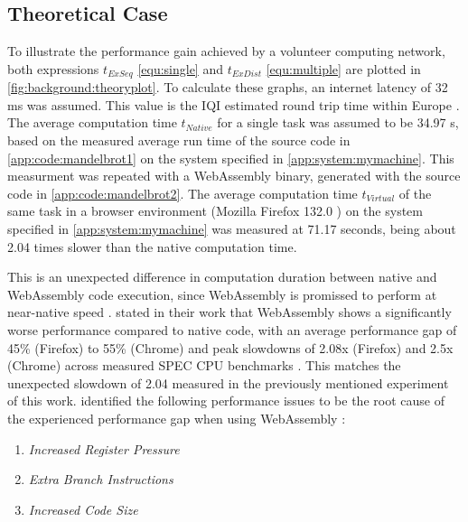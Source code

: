 \subsection{Theoretical Case}
\label{subsec:background:theroy_example}
To illustrate the performance gain achieved by a volunteer computing network, both expressions $t_{ExSeq}$ \eqref{equ:single} and $t_{ExDist}$ \eqref{equ:multiple} are plotted in \autoref{fig:background:theoryplot}. To calculate these graphs, an internet latency of 32 ms \cite{backend:latency} was assumed. This value is the \ac{IQI} estimated round trip time within Europe \cite{backend:latency}. The average computation time $t_{Native}$ for a single task was assumed to be 34.97 s, based on the measured average run time of the source code in \autoref{app:code:mandelbrot1} on the system specified in \autoref{app:system:mymachine}. This measurment was repeated with a WebAssembly binary, generated with the source code in \autoref{app:code:mandelbrot2}. The average computation time $t_{Virtual}$ of the same task in a browser environment (Mozilla Firefox 132.0 \cite{background:firefox}) on the system specified in \autoref{app:system:mymachine} was measured at 71.17 seconds, being about 2.04 times slower than the native computation time.
\newline
\begin{addmargin}[25pt]{25pt}
  This is an unexpected difference in computation duration between native and WebAssembly code execution, since WebAssembly is promissed to perform at near-native speed \cite{methodology:wasm, methodology:wasmW3C}. \citeauthor{background:not-so-fast} stated in their work that WebAssembly shows a significantly worse performance compared to native code, with an average performance gap of 45\% (Firefox) to 55\% (Chrome) and peak slowdowns of 2.08x (Firefox) and 2.5x (Chrome) across measured SPEC \acs{CPU} benchmarks \cite{background:not-so-fast}. This matches the unexpected slowdown of 2.04 measured in the previously mentioned experiment of this work. \citeauthor{background:not-so-fast} identified the following performance issues to be the root cause of the experienced performance gap when using WebAssembly \cite{background:not-so-fast}:
  \begin{enumerate}
    \item \emph{Increased Register Pressure}
    \item \emph{Extra Branch Instructions}
    \item \emph{Increased Code Size}
  \end{enumerate}
\end{addmargin}
